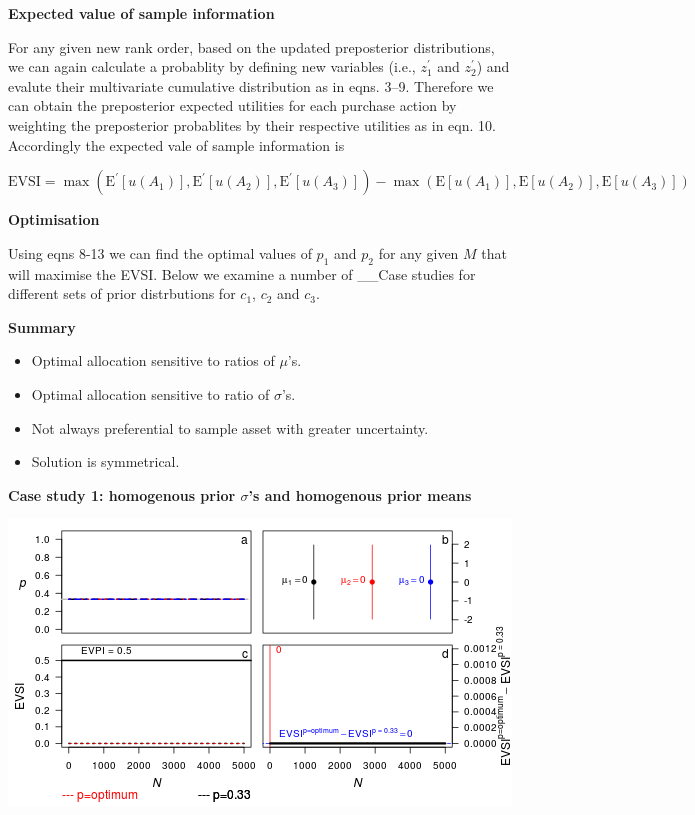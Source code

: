\documentclass[]{article}
\providecommand{\tightlist}{%
  \setlength{\itemsep}{0pt}\setlength{\parskip}{0pt}}
\theoremstyle{definition}
\theoremstyle{definition}
\theoremstyle{remark}
\begin{document}
\textbf{Expected value of sample information}

For any given new rank order, based on the updated preposterior
distributions, we can again calculate a probablity by defining new
variables (i.e., \(z^\prime_1\) and \(z^\prime_2\)) and evalute their
multivariate cumulative distribution as in eqns. 3--9. Therefore we can
obtain the preposterior expected utilities for each purchase action by
weighting the preposterior probablites by their respective utilities as
in eqn. 10. Accordingly the expected vale of sample information is

\begin{equation}
\mathrm{EVSI}=\max(\mathrm{E}^\prime[u(A_1)],\mathrm{E}^\prime[u(A_2)],\mathrm{E}^\prime[u(A_3)])-\max(\mathrm{E}[u(A_1)],\mathrm{E}[u(A_2)],\mathrm{E}[u(A_3)])
\label{eq:evsiapen2}
\end{equation}

\textbf{Optimisation}

Using eqns 8-13 we can find the optimal values of \(p_1\) and \(p_2\)
for any given \(M\) that will maximise the EVSI. Below we examine a
number of \_\_Case studies for different sets of prior distrbutions for
\(c_1\), \(c_2\) and \(c_3\).

\textbf{Summary}

\begin{itemize}
\tightlist
\item
  Optimal allocation sensitive to ratios of \(\mu\)'s.
\item
  Optimal allocation sensitive to ratio of \(\sigma\)'s.
\item
  Not always preferential to sample asset with greater uncertainty.
\item
  Solution is symmetrical.
\end{itemize}

\textbf{Case study 1: homogenous prior \(\sigma\)'s and homogenous prior
means}

\includegraphics{figure/x000_1_1_1-1.png} \clearpage
\end{document}
